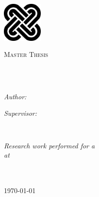 \begin{center}
	
	\vspace{1.8cm}
	\begin{center}
		\includegraphics[height=20mm]{./inputs/01_Cover_Page/solomon}
	\end{center}
	
	\vspace*{.05\textheight}
	\textsc{\Large Master Thesis}\\[0.5cm] 
	
	\HRule \\[0.4cm] %
	{\huge \bfseries \thesistitle \par}\vspace{0.4cm} 
	\HRule \\[1.5cm] %
	
	\begin{minipage}[t]{0.4\textwidth}
		\begin{flushleft} \large
			\emph{Author:}\\
			\authorname %
		\end{flushleft}
	\end{minipage}
	\begin{minipage}[t]{0.4\textwidth}
		\begin{flushright} \large
			\emph{Supervisor:} \\
			\supervisor %
		\end{flushright}
	\end{minipage}\\[2cm]
	
	\vfill
	
	\large \textit{Research work performed for a \degreename}\\[0.3cm]
	\textit{at}\\[0.4cm]
	\groupname\\  \departmentname\\[2cm] 
	
	\vfill
	
	{\small \today}\\[4cm]
	
	\vfill
\end{center}
